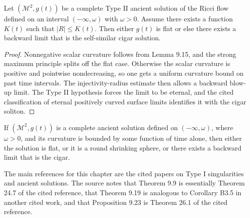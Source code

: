 \begin{proposition}
\label{ch09-prop-type-ii-ancient-surface-limits}

Let \((\mathcal M^2,g(t))\) be a complete Type II ancient solution of the Ricci flow defined on an interval \((-\infty,\omega)\) with \(\omega>0\). Assume there exists a function \(K(t)\) such that \(|R|\le K(t)\). Then either \(g(t)\) is flat or else there exists a backward limit that is the self-similar cigar solution.
\end{proposition}

\begin{proof}
\sketch Nonnegative scalar curvature follows from Lemma 9.15, and the strong maximum principle splits off the flat case. Otherwise the scalar curvature is positive and pointwise nondecreasing, so one gets a uniform curvature bound on past time intervals. The injectivity-radius estimate then allows a backward blow-up limit. The Type II hypothesis forces the limit to be eternal, and the cited classification of eternal positively curved surface limits identifies it with the cigar soliton.
\end{proof}

\begin{corollary}
\label{ch09-cor-ancient-surface-classification}

If \((\mathcal M^2,g(t))\) is a complete ancient solution defined on \((-\infty,\omega)\), where \(\omega>0\), and its curvature is bounded by some function of time alone, then either the solution is flat, or it is a round shrinking sphere, or there exists a backward limit that is the cigar.
\end{corollary}

\begin{remark}
\label{ch09-rem-notes-and-commentary}
The main references for this chapter are the cited papers on Type I singularities and ancient solutions. The source notes that Theorem 9.9 is essentially Theorem 24.7 of the cited reference, that Theorem 9.19 is analogous to Corollary B3.5 in another cited work, and that Proposition 9.23 is Theorem 26.1 of the cited reference.
\end{remark}
